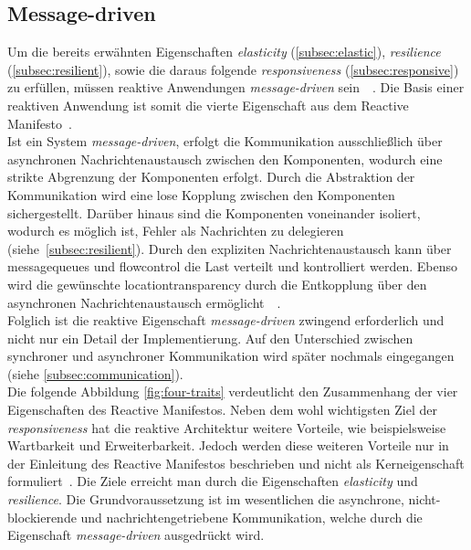 \subsection{Message-driven}\label{subsec:messagedriven}
Um die bereits erwähnten Eigenschaften \textit{elasticity} (\ref{subsec:elastic}), \textit{resilience} (\ref{subsec:resilient}), sowie die daraus folgende \textit{responsiveness} (\ref{subsec:responsive}) zu erfüllen, müssen reaktive Anwendungen \textit{message-driven} sein~\cite{webber_what_2014}~\cite[S.~43]{kuhn_reactive_2015}. Die Basis einer reaktiven Anwendung ist somit die vierte Eigenschaft aus dem Reactive Manifesto~\cite{boner_reactive_2014}.\\
Ist ein System \textit{message-driven}, erfolgt die Kommunikation ausschließlich über asynchronen Nachrichtenaustausch zwischen den Komponenten, wodurch eine strikte Abgrenzung der Komponenten erfolgt. Durch die Abstraktion der Kommunikation wird eine lose Kopplung zwischen den Komponenten sichergestellt. Darüber hinaus sind die Komponenten voneinander isoliert, wodurch es möglich ist, Fehler als Nachrichten zu delegieren (siehe~\ref{subsec:resilient}). Durch den expliziten Nachrichtenaustausch kann über \glspl{messagequeue} und \gls{flowcontrol} die Last verteilt und kontrolliert werden. Ebenso wird die gewünschte \gls{locationtransparency} durch die Entkopplung über den asynchronen Nachrichtenaustausch ermöglicht~\cite{boner_reactive_2015}~\cite[S.~43]{kuhn_reactive_2015}.\\

Folglich ist die reaktive Eigenschaft \textit{message-driven} zwingend erforderlich und nicht nur ein Detail der Implementierung. Auf den Unterschied zwischen synchroner und asynchroner Kommunikation wird später nochmals eingegangen (siehe \ref{subsec:communication}).\\

Die folgende Abbildung \ref{fig:four-traits} verdeutlicht den Zusammenhang der vier Eigenschaften des Reactive Manifestos. Neben dem wohl wichtigsten Ziel der \textit{responsiveness} hat die reaktive Architektur weitere Vorteile, wie beispielsweise Wartbarkeit und Erweiterbarkeit. Jedoch werden diese weiteren Vorteile nur in der Einleitung des Reactive Manifestos beschrieben und nicht als Kerneigenschaft formuliert~\cite{boner_reactive_2014}. Die Ziele erreicht man durch die Eigenschaften \textit{elasticity} und \textit{resilience}. Die Grundvoraussetzung ist im wesentlichen die asynchrone, nicht-blockierende und nachrichtengetriebene Kommunikation, welche durch die Eigenschaft \textit{message-driven} ausgedrückt wird.

